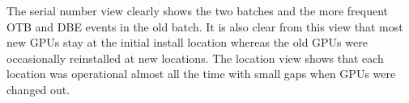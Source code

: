 The serial number view clearly shows the two batches and the more
frequent OTB and DBE events in the old batch. It is also clear from
this view that most new GPUs stay at the initial install location
whereas the old GPUs were occasionally reinstalled at new locations.
The location view shows that each location was operational almost all
the time with small gaps when GPUs were changed out.

